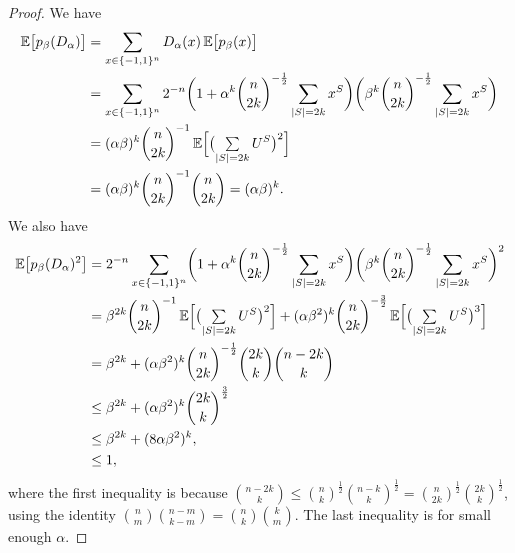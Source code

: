 \documentclass[10pt,a4paper]{article}
\theoremstyle{definition}
\newcommand{\E}{\mathop{\mathbb{E}\/}}
\newcommand{\tsum}{\mathop{{\textstyle \sum}}}
\newcommand{\pmo}{\{-1,1\}}
\DeclarePairedDelimiter\abs{\lvert}{\rvert}
\begin{document}
\begin{proof}
    We have
    \begin{align} \label{eq:OZ-1}
      \E\bigl[p_\beta(D_\alpha)\bigr]
      &= \sum_{x \in \pmo^n} D_\alpha(x) \E \bigl[ p_\beta(x) \bigr] \nonumber \\
      &= \sum_{x \in \pmo^n} 2^{-n} \biggl(1 + \alpha^k \binom{n}{2k}^{-\frac{1}{2}} \sum_{\abs{S}=2k} x^S \biggr) \biggl(  \beta^k \binom{n}{2k}^{-\frac{1}{2}} \sum_{\abs{S}=2k} x^S \biggr) \nonumber \\
      &= (\alpha\beta)^k \binom{n}{2k}^{-1} \E\Bigl[ \bigl(\tsum_{\abs{S}=2k}U^S\bigr)^2 \Bigr] \nonumber \\
      &= (\alpha\beta)^k \binom{n}{2k}^{-1} \binom{n}{2k} 
      = (\alpha\beta)^k .
    \end{align}
    We also have
    \begin{align} \label{eq:OZ-2}
      \E\bigl[p_\beta(D_\alpha)^2\bigr]
      &= 2^{-n} \sum_{x \in \pmo^n} \biggl( 1 + \alpha^k \binom{n}{2k}^{-\frac{1}{2}} \sum_{\abs{S}=2k} x^S \biggr) \biggr( \beta^k \binom{n}{2k}^{-\frac{1}{2}} \sum_{\abs{S}=2k} x^S \biggr)^2 \nonumber \\
      &= \beta^{2k} \binom{n}{2k}^{-1} \E\Bigl[ \bigl(\tsum_{\abs{S}=2k} U^S\bigr)^2 \Bigr] + (\alpha \beta^2)^k \binom{n}{2k}^{-\frac{3}{2}} \E\Bigl[ \bigl(\tsum_{\abs{S}=2k} U^S\bigr)^3\Bigr] \nonumber \\
      &= \beta^{2k} + (\alpha \beta^2)^k \binom{n}{2k}^{-\frac{1}{2}} \binom{2k}{k} \binom{n-2k}{k} \nonumber \\
      &\le \beta^{2k} + (\alpha \beta^2)^k  \binom{2k}{k}^{\frac{3}{2}} \nonumber \\
      &\le \beta^{2k} + (8 \alpha \beta^2)^k ,\nonumber \\
      &\le 1,
    \end{align}
    where the first inequality is because $\binom{n-2k}{k} \le \binom{n}{k}^{\frac{1}{2}} \binom{n-k}{k}^{\frac{1}{2}} = \binom{n}{2k}^{\frac{1}{2}} \binom{2k}{k}^\frac{1}{2}$, using the identity $\binom{n}{m}\binom{n-m}{k-m} = \binom{n}{k}\binom{k}{m}$.  The last inequality is for small enough $\alpha$.


\end{proof}
\end{document}
